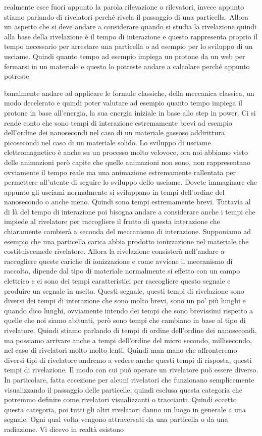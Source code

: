 realmente esce fuori appunto la parola rilevazione o rilevatori, invece appunto stiamo parlando di rivelatori perché rivela il passaggio di una particella. Allora un aspetto che si deve andare a considerare quando si studia la rivelazione quindi alla base della rivelazione è il tempo di interazione e questo rappresenta proprio il tempo necessario per arrestare una particella o ad esempio per lo sviluppo di un usciame. Quindi quanto tempo ad esempio impiega un protone da un web per fermarsi in un materiale e questo lo potreste andare a calcolare perché appunto potreste 

banalmente andare ad applicare le formule classiche, della meccanica classica, un modo decelerato e quindi poter valutare ad esempio quanto tempo impiega il protone in base all'energia, la sua energia iniziale in base allo step in power. Ci si rende conto che sono tempi di interazione estremamente brevi ad esempio dell'ordine dei nanosecondi nel caso di un materiale gassoso addirittura picosecondi nel caso di un materiale solido. Lo sviluppo di usciame elettromagnetico è anche su un processo molto velovoce, ora noi abbiamo visto delle animazioni però capite che quelle animazioni non sono, non rappresentano ovviamente il tempo reale ma una animazione estremamente rallentata per permettere all'utente di seguire lo sviluppo dello usciame. Dovete immaginare che appunto gli usciami normalmente si sviluppano in tempi dell'ordine del nanosecondo o anche meno. Quindi sono tempi estremamente brevi. Tuttavia al di là del tempo di interazione poi bisogna andare a considerare anche i tempi che impiede al rivelatore per raccogliere il frutto di questa interazione che chiaramente cambierà a seconda del meccanismo di interazione. Supponiamo ad esempio che una particella carica abbia prodotto ionizzazione nel materiale che costituiscemede rivelatore. Allora la rivelazione consisterà nell'andare a raccogliere queste cariche di ionizzazione e come avviene il meccanismo di raccolta, dipende dal tipo di materiale normalmente si effetto con un campo elettrico e ci sono dei tempi caratteristici per raccogliere questo segnale e produire un segnale in uscita. Questi segnale, questi tempi di rivelazione sono diversi dei tempi di interazione che sono molto brevi, sono un po' più lunghi e quando dico lunghi, ovviamente intendo dei tempi che sono brevissimi rispetto a quelle che noi siamo abituati, però sono tempi che cambiano in base al tipo di rivelatore. Quindi stiamo parlando di tempi di ordine dell'ordine dei nanosecondi, ma possiamo arrivare anche a tempi dell'ordine del micro secondo, millisecondo, nel caso di rivelatori molto molto lenti. Quindi man mano che affronteremo diversi tipi di rivelatore andremo a vedere anche questi tempi di risposta, questi tempi di rivelazione. Il modo con cui può operare un rivelatore può essere diverso. In particolare, fatta eccezione per alcuni rivelatori che funzionano semplicemente visualizzando il passaggio delle particelle, quindi esclusa questa categoria che potremmo definire come rivelatori visualizzanti o traccianti. Quindi eccetto questa categoria, poi tutti gli altri rivelatori danno un luogo in generale a una segnale. Ogni qual volta vengono attraversati da una particella o da una radiazione. Vi dicevo in realtà esistono 